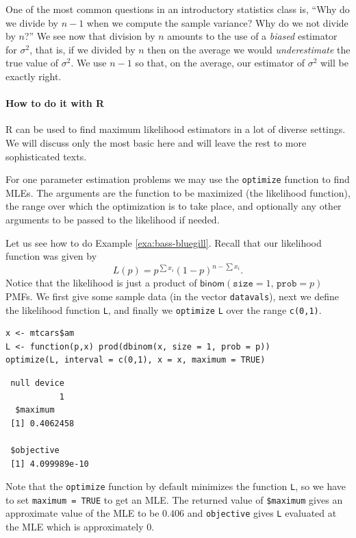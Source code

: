 \documentclass[captions=tableheading]{scrbook}
\begin{document}
One of the most common questions in an introductory statistics class is, ``Why do we divide by \(n-1\) when we compute the sample variance? Why do we not divide by \(n\)?'' We see now that division by \(n\) amounts to the use of a \emph{biased} estimator for \(\sigma^{2}\), that is, if we divided by \(n\) then on the average we would \emph{underestimate} the true value of \(\sigma^{2}\). We use \(n-1\) so that, on the average, our estimator of \(\sigma^{2}\) will be exactly right. 


\paragraph*{How to do it with \textsf{R}}

\textsf{R} can be used to find maximum likelihood estimators in a lot of diverse settings. We will discuss only the most basic here and will leave the rest to more sophisticated texts.

For one parameter estimation problems we may use the \texttt{optimize} function to find MLEs. The arguments are the function to be maximized (the likelihood function), the range over which the optimization is to take place, and optionally any other arguments to be passed to the likelihood if needed.

Let us see how to do Example \ref{exa:bass-bluegill}. Recall that our likelihood function was given by
\begin{equation}
L(p)=p^{\sum x_{i}}(1-p)^{n-\sum x_{i}}.
\end{equation}
Notice that the likelihood is just a product of \(\mathsf{binom}(\mathtt{size}=1,\,\mathtt{prob}=p)\) PMFs. We first give some sample data (in the vector \texttt{datavals}), next we define the likelihood function \texttt{L}, and finally we \texttt{optimize} \texttt{L} over the range \texttt{c(0,1)}.


\begin{verbatim}
x <- mtcars$am
L <- function(p,x) prod(dbinom(x, size = 1, prob = p))
optimize(L, interval = c(0,1), x = x, maximum = TRUE)
\end{verbatim}

\begin{verbatim}
 null device 
           1
  $maximum
 [1] 0.4062458
 
 $objective
 [1] 4.099989e-10
\end{verbatim}



Note that the \texttt{optimize} function by default minimizes the function \texttt{L}, so we have to set \texttt{maximum = TRUE} to get an MLE. The returned value of \texttt{\$maximum} gives an approximate value of the MLE to be \(  0.406 \) and \texttt{objective} gives \texttt{L} evaluated at the MLE which is approximately \(  0 \).
\end{document}
